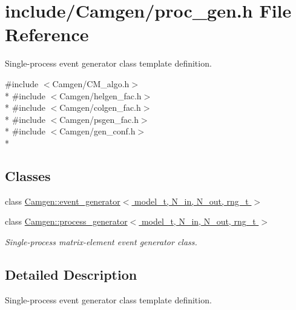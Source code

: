 \hypertarget{a00706}{\section{include/\-Camgen/proc\-\_\-gen.h File Reference}
\label{a00706}
}


Single-\/process event generator class template definition.  


{\ttfamily \#include $<$Camgen/\-C\-M\-\_\-algo.\-h$>$}\\*
{\ttfamily \#include $<$Camgen/helgen\-\_\-fac.\-h$>$}\\*
{\ttfamily \#include $<$Camgen/colgen\-\_\-fac.\-h$>$}\\*
{\ttfamily \#include $<$Camgen/psgen\-\_\-fac.\-h$>$}\\*
{\ttfamily \#include $<$Camgen/gen\-\_\-conf.\-h$>$}\\*
\subsection*{Classes}
\begin{DoxyCompactItemize}
\item 
class \hyperlink{a00210}{Camgen\-::event\-\_\-generator$<$ model\-\_\-t, N\-\_\-in, N\-\_\-out, rng\-\_\-t $>$}
\item 
class \hyperlink{a00430}{Camgen\-::process\-\_\-generator$<$ model\-\_\-t, N\-\_\-in, N\-\_\-out, rng\-\_\-t $>$}
\begin{DoxyCompactList}\small\item\em Single-\/process matrix-\/element event generator class. \end{DoxyCompactList}\end{DoxyCompactItemize}


\subsection{Detailed Description}
Single-\/process event generator class template definition. 